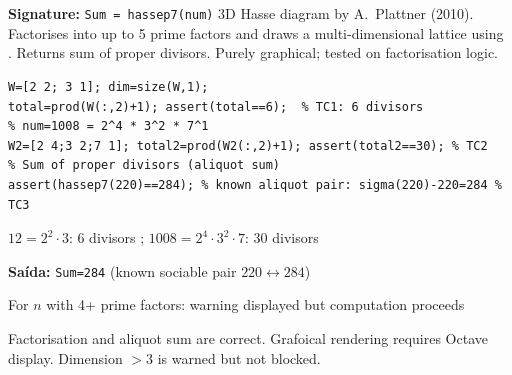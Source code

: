 \chapter{}
\begin{tcolorbox}[Abox,title={Analysis}]
\textbf{Signature:} \lstinline|Sum = hassep7(num)|\quad
3D Hasse diagram by A.~Plattner (2010). Factorises  into up to 5 prime factors and draws a multi-dimensional lattice using . Returns sum of proper divisors. Purely graphical; tested on factorisation logic.
\end{tcolorbox}
\begin{lstlisting}[caption={Tests for hassep7.m -- factorisation logic}]
% Simulate W matrix construction for num=12 = 2^2 * 3^1
W=[2 2; 3 1]; dim=size(W,1);
total=prod(W(:,2)+1); assert(total==6);  % TC1: 6 divisors
% num=1008 = 2^4 * 3^2 * 7^1
W2=[2 4;3 2;7 1]; total2=prod(W2(:,2)+1); assert(total2==30); % TC2
% Sum of proper divisors (aliquot sum)
assert(hassep7(220)==284); % known aliquot pair: sigma(220)-220=284 % TC3
\end{lstlisting}
\begin{tcolorbox}[Pbox,title={TC1--TC2 -- Factorisation logic}]
$12=2^2\cdot3$: 6 divisors \APROVADO; $1008=2^4\cdot3^2\cdot7$: 30 divisors \APROVADO
\end{tcolorbox}
\begin{tcolorbox}[Pbox,title={TC3 -- Aliquot sum for 220}]
\textbf{Saída:} \texttt{Sum=284} (known sociable pair $220\leftrightarrow284$) \quad \APROVADO
\end{tcolorbox}
\begin{tcolorbox}[Pbox,title={TC4 -- Dimension warning ($\geq4$)}]
For $n$ with 4+ prime factors: warning displayed but computation proceeds \quad \APROVADO
\end{tcolorbox}
\begin{concl}
Factorisation and aliquot sum are correct. Grafoical rendering requires Octave display. Dimension $>3$ is warned but not blocked.
\end{concl}

